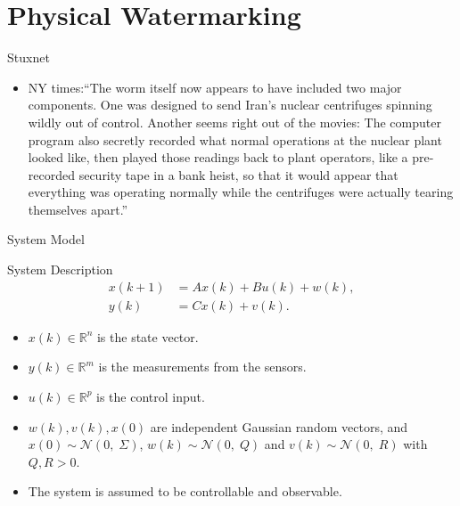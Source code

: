 \documentclass[10pt]{beamer}
\begin{document}
\section{Physical Watermarking}
\frame{\tableofcontents[currentsection]}

\begin{frame}{Stuxnet}
  \begin{itemize}
    \item NY times:``The worm itself now appears to have included two major components. One was designed to send Iran's nuclear centrifuges spinning wildly out of control. Another seems right out of the movies: The computer program also \alert{secretly recorded what normal operations at the nuclear plant looked like, then played those readings back to plant operators}, like a pre-recorded security tape in a bank heist, so that it would appear that everything was operating normally while the centrifuges were actually tearing themselves apart.''
  \end{itemize}
\end{frame}

\begin{frame}{System Model}
  \begin{block}{System Description}
      \begin{displaymath}
	\begin{split}
	  x(k+1) &= Ax(k)  + Bu(k)+w(k),\\
	  y(k) &= C x(k) + v(k).
	\end{split}
      \end{displaymath}
    \end{block}
    \begin{itemize}
      \item $x(k) \in \mathbb R^n$ is the state vector.
      \item  $y(k) \in \mathbb R^m$ is the measurements from the sensors.
      \item  $u(k) \in \mathbb R^p$ is the control input.
      \item $w(k),v(k),x(0)$ are independent Gaussian random vectors, and $x(0) \sim \mathcal N(0,\;\Sigma)$, $w(k) \sim \mathcal N(0,\;Q)$ and $v(k) \sim \mathcal N(0,\;R)$ with $Q,R>0$.
      \item The system is assumed to be controllable and observable.
    \end{itemize}
  \end{frame}
\end{document}
